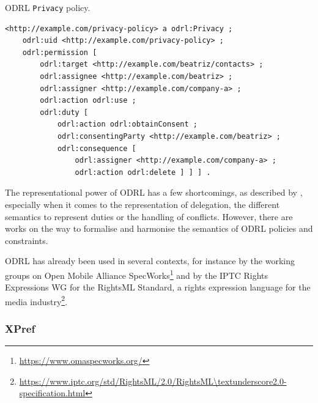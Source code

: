 \begin{listing}
\caption{ODRL \texttt{Privacy} policy.}
\label{list:odrl_example}
\begin{verbatim}
<http://example.com/privacy-policy> a odrl:Privacy ;
    odrl:uid <http://example.com/privacy-policy> ;
    odrl:permission [
        odrl:target <http://example.com/beatriz/contacts> ;
        odrl:assignee <http://example.com/beatriz> ;
        odrl:assigner <http://example.com/company-a> ;
        odrl:action odrl:use ;
        odrl:duty [
            odrl:action odrl:obtainConsent ;
            odrl:consentingParty <http://example.com/beatriz> ;
            odrl:consequence [
                odrl:assigner <http://example.com/company-a> ;
                odrl:action odrl:delete ] ] ] . 
\end{verbatim}
\end{listing}

The representational power of ODRL has a few shortcomings, as described by \cite{kebede_critical_2020}, especially when it comes to the representation of delegation, the different semantics to represent duties or the handling of conflicts. However, there are works \citep{fornara_operational_2018, fornara_using_2019} on the way to formalise and harmonise the semantics of ODRL policies and constraints.

ODRL has already been used in several contexts, for instance by the working groups on Open Mobile Alliance SpecWorks\footnote{\url{https://www.omaspecworks.org/}} and by the IPTC Rights Expressions WG for the RightsML Standard, a rights expression language for the media industry\footnote{\url{https://www.iptc.org/std/RightsML/2.0/RightsML\textunderscore2.0-specification.html}}.

\subsubsection{XPref}
\label{sec:xpref}

